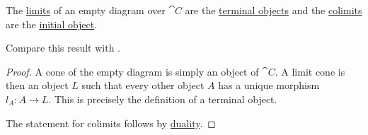 \begin{proposition}\label{thm:limits_of_empty_diagram}
  The \hyperref[def:category_of_cones/limit]{limits} of an empty diagram over \( \cat{C} \) are the \hyperref[def:universal_objects/terminal]{terminal objects} and the \hyperref[def:category_of_cones/colimit]{colimits} are the \hyperref[def:universal_objects/initial]{initial object}.

  Compare this result with .
\end{proposition}
\begin{proof}
  A cone of the empty diagram is simply an object of \( \cat{C} \). A limit cone is then an object \( L \) such that every other object \( A \) has a unique morphism \( l_A: A \to L \). This is precisely the definition of a terminal object.

  The statement for colimits follows by \hyperref[thm:categorical_principle_of_duality]{duality}.
\end{proof}


